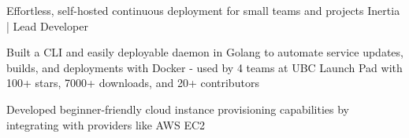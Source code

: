  {\scshape{}}
\begin{cventries}

  \cventry
    {Effortless, self-hosted continuous deployment for small teams and projects} %
    {Inertia | Lead Developer} %
    {} %
    {} %
    {
      \begin{cvitems} %
        \item {Built a CLI and easily deployable daemon in Golang to automate service updates, builds, and deployments with Docker - used by 4 teams at UBC Launch Pad with 100+ stars, 7000+ downloads, and 20+ contributors}
        \item {Developed beginner-friendly cloud instance provisioning capabilities by integrating with providers like AWS EC2}
      \end{cvitems}
    }
\iffalse
  \cventry
    {Game scouting and performance analytics for League of Legends teams} %
    {Seer | Personal Project} %
    {\linktext{bobheadxi.dev/r/seer}} %
    {} %
    {
      \begin{cvitems} %
        \item {Leveraged Google BigQuery as a data warehouse for team match history and queries for trends and aggregations}
        \item {Built a job-based framework in Go for ingesting data and for error resilience (e.g. rate limits of dependencies)}
      \end{cvitems}
    }
\fi
\iffalse
  \cventry
    {Continuous benchmarking and benchmark visualization} %
    {Gobenchdata | Personal Project} %
    {\linktext{bobheadxi.dev/r/gobenchdata}} %
    {} %
    {
      \begin{cvitems} %
        \item {built a command-line tool and GitHub action for automatically running Go benchmarks and parsing output into JSON}
        \item {created a web application that can visualize JSON data stored in GitHub pages to chart performance improvements}
      \end{cvitems}
    }
\fi


\end{cventries}
